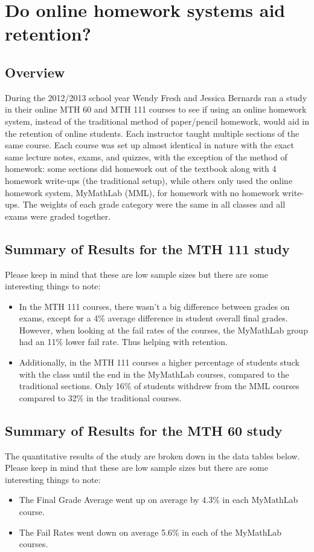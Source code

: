 \chapter{Do online homework systems aid retention?}
\label{app:sec:onlinehwstudy}

\section{Overview}
During the 2012/2013 school year Wendy Fresh and Jessica Bernards ran a study in their online MTH 60 and MTH 111 courses to see if using an online homework system, instead of the traditional method of paper/pencil homework, would aid in the retention of online students.  Each instructor taught multiple sections of the same course.  Each course was set up almost identical in nature with the exact same lecture notes, exams, and quizzes, with the exception of the method of homework: some sections did homework out of the textbook along with 4 homework write-ups (the traditional setup), while others only used the online homework system, MyMathLab (MML), for homework with no homework write-ups.  The weights of each grade category were the same in all classes and all exams were graded together.

\section{Summary of Results for the MTH 111 study}
Please keep in mind that these are low sample sizes but there are some interesting things to note: 
\begin{itemize}
  \item In the MTH 111 courses, there wasn't a big difference between grades on exams, except for a 4\% average difference in student overall final grades.  However, when looking at the fail rates of the courses, the MyMathLab group had an 11\% lower fail rate.  Thus helping with retention.
  \item Additionally, in the MTH 111 courses a higher percentage of students stuck with the class until the end in the MyMathLab courses, compared to the traditional sections.  Only 16\% of students withdrew from the MML courses compared to 32\% in the traditional courses.  
\end{itemize}

\section{Summary of Results for the MTH 60 study}
The quantitative results of the study are broken down in the data tables below.  Please keep in mind that these are low sample sizes but there are some interesting things to note: 
\begin{itemize}
  \item The Final Grade Average went up on average by 4.3\% in each MyMathLab course. 
  \item The Fail Rates went down on average 5.6\% in each of the MyMathLab courses.
\end{itemize}

